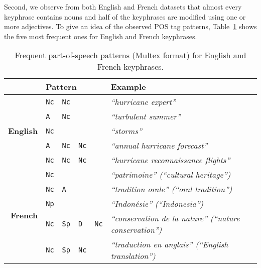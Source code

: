     Second, we observe from both English and French datasets that almost every
    keyphrase contains nouns and half of the keyphrases are modified using one
    or more adjectives. %
    To give an idea of the observed POS tag patterns,
    Table~\ref{tab:best_patterns} shows the five most frequent ones for English
    and French keyphrases.
    \begin{table}
      \centering
      \begin{tabular}{r|lllll}
        \toprule
        \multicolumn{1}{r}{} & \multicolumn{4}{l}{\textbf{Pattern}} & \textbf{Example}\\
        \midrule
        \multirow{5}{*}[-2pt]{\begin{sideways}\textbf{English}\end{sideways}} & \verb:Nc: & \verb:Nc: & & & \textit{``hurricane expert''}\\ %
        & \verb:A: & \verb:Nc: & & & \textit{``turbulent summer''}\\ %
        & \verb:Nc: & & & & \textit{``storms''}\\ %
        & \verb:A: & \verb:Nc: & \verb:Nc: & & \textit{``annual hurricane forecast''}\\ %
        & \verb:Nc: & \verb:Nc: & \verb:Nc: & & \textit{``hurricane reconnaissance flights''}\\ %
        \hline%
        \multirow{5}{*}[-2pt]{\begin{sideways}\textbf{French}\end{sideways}} & \verb:Nc: & & & & \textit{``patrimoine'' (``cultural heritage'')}\\ %
        & \verb:Nc: & \verb:A: & & & \textit{``tradition orale'' (``oral tradition'')}\\ %
        & \verb:Np: & & & & \textit{``Indonésie'' (``Indonesia'')}\\ %
        & \verb:Nc: & \verb:Sp: & \verb:D: & \verb:Nc: & \textit{``conservation de la nature'' (``nature conservation'')}\\ %
        & \verb:Nc: & \verb:Sp: & \verb:Nc: & & \textit{``traduction en anglais'' (``English translation'')}\\ %
        \bottomrule
      \end{tabular}
      \caption{Frequent part-of-speech patterns (Multex format) for English and
               French keyphrases. \label{tab:best_patterns}}
    \end{table}

